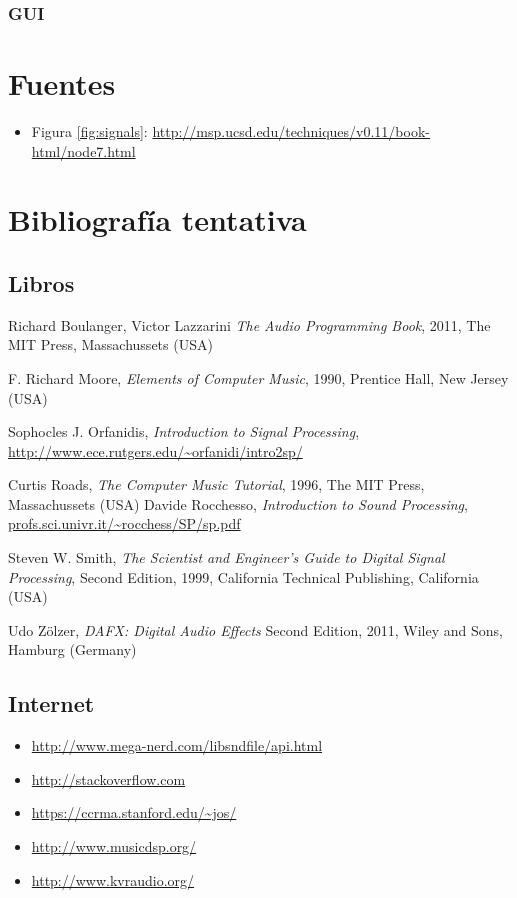 \documentclass[a4paper,spanish,12pt]{article}
\begin{document}
\subsubsection{GUI}
\label{subsec:gui}

\newpage\section{Fuentes}
\begin{itemize}
\item Figura \ref{fig:signals}: \url{http://msp.ucsd.edu/techniques/v0.11/book-html/node7.html}
\end{itemize}

\newpage\section{Bibliografía tentativa}
\subsection{Libros}
\begin{thebibliography}{9}
  Richard Boulanger, Victor Lazzarini
  \emph{The Audio Programming Book},
  2011, The MIT Press, Massachussets (USA)
 
  F. Richard Moore,
  \emph{Elements of Computer Music},
  1990, Prentice Hall, New Jersey (USA)

  Sophocles J. Orfanidis,
  \emph{Introduction to Signal Processing}, \\
  \url{http://www.ece.rutgers.edu/~orfanidi/intro2sp/}
  
  Curtis Roads,
  \emph{The Computer Music Tutorial},
  1996, The MIT Press, Massachussets (USA)
  Davide Rocchesso,
  \emph{Introduction to Sound Processing},
  \url{profs.sci.univr.it/~rocchess/SP/sp.pdf}
  
  Steven W. Smith,
  \emph{The Scientist and Engineer's Guide to Digital Signal Processing},
  Second Edition, 1999, California Technical Publishing, California (USA)
  
  Udo Zölzer,
  \emph{DAFX: Digital Audio Effects}
  Second Edition, 2011, Wiley and Sons, Hamburg (Germany)
\end{thebibliography}
  
\subsection{Internet}

\begin{itemize}
\item \url{http://www.mega-nerd.com/libsndfile/api.html}
\item \url{http://stackoverflow.com}
\item \url{https://ccrma.stanford.edu/~jos/}
\item \url{http://www.musicdsp.org/}
\item \url{http://www.kvraudio.org/}
\end{itemize}
\end{document}
